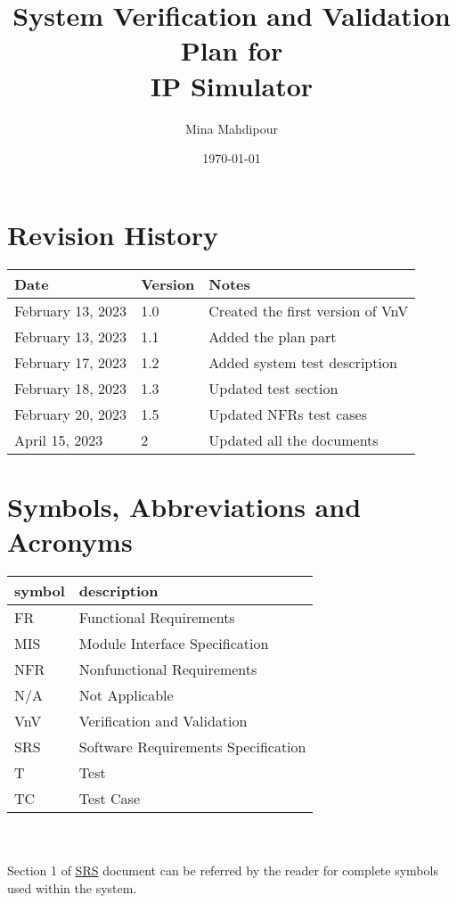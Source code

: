 \documentclass[12pt, titlepage]{article}
\begin{document}
\title{System Verification and Validation Plan for \\IP Simulator}
\author{Mina Mahdipour}
\date{\today}
	
\maketitle


\section{Revision History}

\begin{tabularx}{\textwidth}{p{4cm}p{2cm}X}
\toprule {\bf Date} & {\bf Version} & {\bf Notes}\\
\midrule
February 13, 2023 & 1.0 & Created the first version of VnV\\
February 13, 2023 & 1.1 & Added the plan part\\
February 17, 2023 & 1.2 & Added system test description\\
February 18, 2023 & 1.3 & Updated test section\\
February 20, 2023 & 1.5 & Updated NFRs test cases\\
April 15, 2023 & 2 & Updated all the documents\\
\bottomrule
\end{tabularx}

\newpage

\tableofcontents

\listoftables


\newpage

\section{Symbols, Abbreviations and Acronyms}

\renewcommand{\arraystretch}{1.2}
\begin{tabular}{l l} 
  \toprule		
  \textbf{symbol} & \textbf{description}\\
  \midrule 
 
  FR & Functional Requirements\\
  MIS & Module Interface Specification\\
  NFR & Nonfunctional Requirements\\
  N/A & Not Applicable\\
  VnV & Verification and Validation\\
SRS & Software Requirements Specification\\
 T & Test\\
 TC& Test Case\\
\bottomrule
\end{tabular}\\
\\
Section 1 of \href{https://github.com/MinMah23/CAS741-Project/tree/main/docs/SRS/SRS.pdf}{SRS} document can be referred by the reader for complete symbols used within the system.
\newpage
\end{document}
